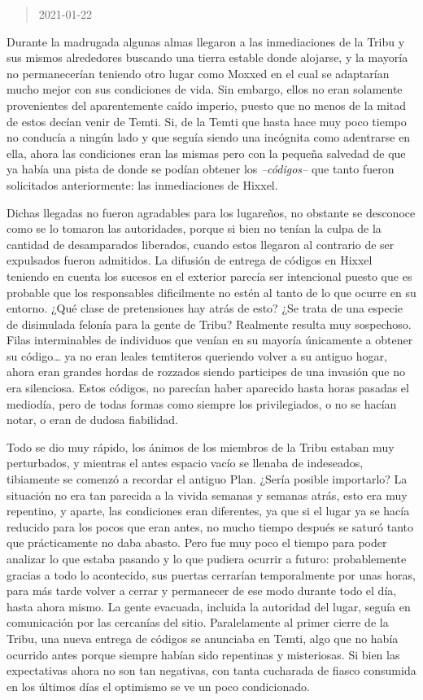 \documentclass[
  spanish,
]{book}
\begin{document}
\begin{quote}
2021-01-22
\end{quote}

Durante la madrugada algunas almas llegaron a las inmediaciones de la Tribu y sus mismos alrededores buscando una tierra estable donde alojarse, y la mayoría no permanecerían teniendo otro lugar como Moxxed en el cual se adaptarían mucho mejor con sus condiciones de vida. Sin embargo, ellos no eran solamente provenientes del aparentemente caído imperio, puesto que no menos de la mitad de estos decían venir de Temti. Si, de la Temti que hasta hace muy poco tiempo no conducía a ningún lado y que seguía siendo una incógnita como adentrarse en ella, ahora las condiciones eran las mismas pero con la pequeña salvedad de que ya había una pista de donde se podían obtener los \emph{--códigos--} que tanto fueron solicitados anteriormente: las inmediaciones de Hixxel.

Dichas llegadas no fueron agradables para los lugareños, no obstante se desconoce como se lo tomaron las autoridades, porque si bien no tenían la culpa de la cantidad de desamparados liberados, cuando estos llegaron al contrario de ser expulsados fueron admitidos. La difusión de entrega de códigos en Hixxel teniendo en cuenta los sucesos en el exterior parecía ser intencional puesto que es probable que los responsables dificilmente no estén al tanto de lo que ocurre en su entorno. ¿Qué clase de pretensiones hay atrás de esto? ¿Se trata de una especie de disimulada felonía para la gente de Tribu?
Realmente resulta muy sospechoso.
Filas interminables de individuos que venían en su mayoría únicamente a obtener su código\ldots{} ya no eran leales temtiteros queriendo volver a su antiguo hogar, ahora eran grandes hordas de rozzados siendo participes de una invasión que no era silenciosa.
Estos códigos, no parecían haber aparecido hasta horas pasadas el mediodía, pero de todas formas como siempre los privilegiados, o no se hacían notar, o eran de dudosa fiabilidad.

Todo se dio muy rápido, los ánimos de los miembros de la Tribu estaban muy perturbados, y mientras el antes espacio vacío se llenaba de indeseados, tibiamente se comenzó a recordar el antiguo Plan. ¿Sería posible importarlo?
La situación no era tan parecida a la vivida semanas y semanas atrás, esto era muy repentino, y aparte, las condiciones eran diferentes, ya que si el lugar ya se hacía reducido para los pocos que eran antes, no mucho tiempo después se saturó tanto que prácticamente no daba abasto. Pero fue muy poco el tiempo para poder analizar lo que estaba pasando y lo que pudiera ocurrir a futuro: probablemente gracias a todo lo acontecido, sus puertas cerrarían temporalmente por unas horas, para más tarde volver a cerrar y permanecer de ese modo durante todo el día, hasta ahora mismo. La gente evacuada, incluida la autoridad del lugar, seguía en comunicación por las cercanías del sitio.
Paralelamente al primer cierre de la Tribu, una nueva entrega de códigos se anunciaba en Temti, algo que no había ocurrido antes porque siempre habían sido repentinas y misteriosas. Si bien las expectativas ahora no son tan negativas, con tanta cucharada de fiasco consumida en los últimos días el optimismo se ve un poco condicionado.
\end{document}
